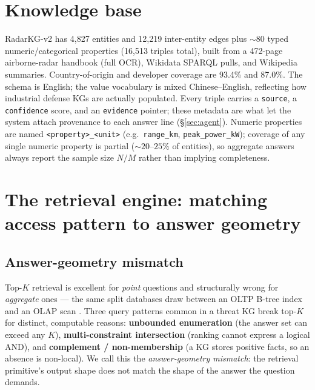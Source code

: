 \documentclass[review]{elsarticle}
\begin{document}
\section{Knowledge base}
\label{sec:kg}

RadarKG-v2 has 4{,}827 entities and 12{,}219 inter-entity edges plus
${\sim}80$ typed numeric/categorical properties (16{,}513 triples total),
built from a 472-page airborne-radar handbook (full OCR), Wikidata SPARQL
pulls, and Wikipedia summaries. Country-of-origin and developer coverage are
93.4\% and 87.0\%. The schema is English; the value vocabulary is mixed
Chinese--English, reflecting how industrial defense KGs are actually
populated. Every triple carries a \texttt{source}, a \texttt{confidence}
score, and an \texttt{evidence} pointer; these metadata are what let the system
attach provenance to each answer line (\S\ref{sec:agent}). Numeric properties
are named \texttt{<property>\_<unit>} (e.g.\ \texttt{range\_km},
\texttt{peak\_power\_kW}); coverage of any single numeric property is partial
(${\sim}20$--$25\%$ of entities), so aggregate answers always report the
sample size $N/M$ rather than implying completeness.

\section{The retrieval engine: matching access pattern to answer geometry}
\label{sec:engine}

\subsection{Answer-geometry mismatch}
Top-$K$ retrieval is excellent for \emph{point} questions and structurally
wrong for \emph{aggregate} ones --- the same split databases draw between an
OLTP B-tree index and an OLAP scan \citep{codd1970relational}. Three query
patterns common in a threat KG break top-$K$ for distinct, computable reasons:
\textbf{unbounded enumeration} (the answer set can exceed any $K$),
\textbf{multi-constraint intersection} (ranking cannot express a logical AND),
and \textbf{complement / non-membership} (a KG stores positive facts, so an
absence is non-local). We call this the \emph{answer-geometry mismatch}: the
retrieval primitive's output shape does not match the shape of the answer the
question demands.
\end{document}
